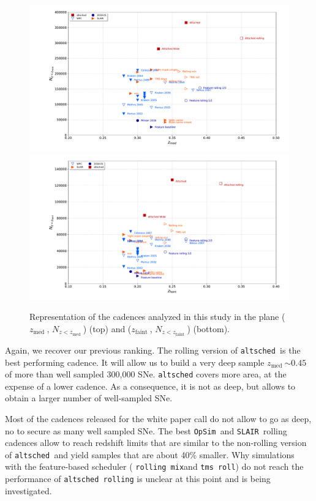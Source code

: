 \documentclass[a4paper,10pt]{article}
\newcommand{\zfaint}{$z_{\mathrm{faint}}\ $}
\newcommand{\nsnfaint}{$N_{z<z_{\mathrm{faint}}}\ $}
\newcommand{\zmed}{$z_{\mathrm{med}}\ $}
\newcommand{\nsnmed}{$N_{z<z_{\mathrm{med}}}\ $}
\newcommand{\opsim}{{\tt OpSim\ }}
\newcommand{\slair}{{\tt SLAIR\ }}
\newcommand{\altsched}{{\tt altsched\ }}
\begin{document}
\begin{figure}[htbp]
  \begin{center}
    \includegraphics[width=\linewidth]{summary_plot_wfd_mediansn.pdf}
    \includegraphics[width=\linewidth]{summary_plot_wfd_faintsn.pdf}
    \caption{Representation of the cadences analyzed in this study in
      the plane (\zmed, \nsnmed) (top) and (\zfaint, \nsnfaint) (bottom).}
    \label{fig:nsn_zmax_med}
  \end{center}
\end{figure}

Again, we recover our previous ranking.  The rolling version of
\altsched is the best performing cadence.  It will allow us to build a
very deep sample \zmed $\sim 0.45$ of more than well sampled 300,000
SNe.  {\tt altsched} covers more area, at the expense of a lower
cadence.  As a consequence, it is not as deep, but allows to obtain a
larger number of well-sampled SNe.

Most of the cadences released for the white paper call do not allow to
go as deep, no to secure as many well sampled SNe. The best \opsim and
\slair rolling cadences allow to reach redshift limits that are
similar to the non-rolling version of \altsched and yield samples that
are about 40\% smaller. Why simulations with the feature-based scheduler ( {\tt rolling mix}and {\tt tms roll}) do not reach the
performance of {\tt altsched rolling} is unclear at this point and is
being investigated.
\end{document}
